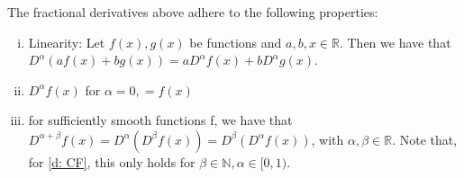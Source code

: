 \begin{proposition} 
    The fractional derivatives above adhere to the following properties:
    \begin{enumerate}[(i)]
        \item Linearity: Let \(f(x), g(x)\) be functions and \(a, b, x \in \mathbb{R}\). Then we have that \(D^{\alpha} (a f(x) + b g(x)) = a D^{\alpha} f(x) + b D^{\alpha} g(x)\).
        \item \(D^{\alpha} f(x)\) for \(\alpha = 0, = f(x)\) 
        \item for sufficiently smooth functions f, we have that \(D^{\alpha + \beta} f(x) = D^\alpha(D^\beta f(x)) =  D^\beta(D^\alpha f(x))\), with \(\alpha, \beta \in \mathbb{R}\). Note that, for \autoref{d: CF}, this only holds for \(\beta \in \mathbb{N}, \alpha \in [0,1)\).
    \end{enumerate}
        
    
\end{proposition}

